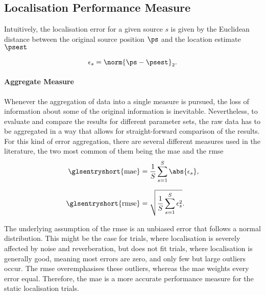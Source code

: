 \subsection{Localisation Performance Measure}
\label{sec:performanceMeasure}

Intuitively, the localisation error for a given source $s$ is given by the Euclidean distance between the original source position $\ps$ and the location estimate $\psest$

\begin{equation}
	\epsilon_s = \norm{\ps-\psest}_{2}.
	\label{eq:error}
\end{equation}

\paragraph{Aggregate Measure} Whenever the aggregation of data into a single measure is pursued, the loss of information about some of the original information is inevitable. Nevertheless, to evaluate and compare the results for different parameter sets, the raw data has to be aggregated in a way that allows for straight-forward comparison of the results. For this kind of error aggregation, there are several different measures used in the literature, the two most common of them being the \gls{mae} and the \gls{rmse}
\begin{align}
	\text{\glsentryshort{mae}}  & =\frac{1}{S}\sum_{s=1}^{S}\abs{\epsilon_s},    \\[6pt]
	\text{\glsentryshort{rmse}} & =\sqrt{\frac{1}{S}\sum_{s=1}^{S}\epsilon_s^2}.
	\label{eq:maeGeneral}
\end{align}

The underlying assumption of the \gls{rmse} is an unbiased error that follows a normal distribution. This might be the case for trials, where localisation is severely affected by noise and reverberation, but does not fit trials, where localisation is generally good, meaning most errors are zero, and only few but large outliers occur. The \gls{rmse} overemphasises these outliers, whereas the \gls{mae} weights every error equal. Therefore, the \gls{mae} is a more accurate performance measure for the static localisation trials.

